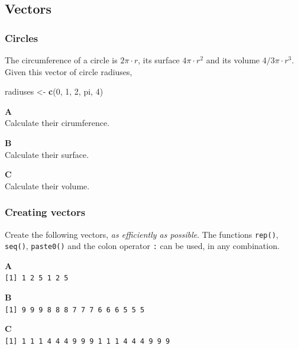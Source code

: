\documentclass[]{book}
\newenvironment{Shaded}{\begin{snugshade}}{\end{snugshade}}
\newcommand{\DecValTok}[1]{\textcolor[rgb]{0.00,0.00,0.81}{#1}}
\newcommand{\KeywordTok}[1]{\textcolor[rgb]{0.13,0.29,0.53}{\textbf{#1}}}
\newcommand{\NormalTok}[1]{#1}
\newcommand{\StringTok}[1]{\textcolor[rgb]{0.31,0.60,0.02}{#1}}
\begin{document}
\hypertarget{vectors-1}{%
\subsection{Vectors}\label{vectors-1}}

\hypertarget{circles}{%
\subsubsection*{Circles}\label{circles}}

The circumference of a circle is \(2\pi\cdot r\), its surface \(4\pi \cdot r^2\) and its volume \(4/3 \pi\cdot r^3\).
Given this vector of circle radiuses,

\begin{Shaded}
\begin{Highlighting}[]
\NormalTok{radiuses <-}\StringTok{ }\KeywordTok{c}\NormalTok{(}\DecValTok{0}\NormalTok{, }\DecValTok{1}\NormalTok{, }\DecValTok{2}\NormalTok{, pi, }\DecValTok{4}\NormalTok{)}
\end{Highlighting}
\end{Shaded}

\textbf{A}\\
Calculate their cirumference.

\textbf{B}\\
Calculate their surface.

\textbf{C}\\
Calculate their volume.

\hypertarget{creating-vectors-1}{%
\subsubsection*{Creating vectors}\label{creating-vectors-1}}

Create the following vectors, \emph{as efficiently as possible}. The functions \texttt{rep()}, \texttt{seq()}, \texttt{paste0()} and the colon operator \texttt{:} can be used, in any combination.

\textbf{A}\\
\texttt{{[}1{]}\ 1\ 2\ 5\ 1\ 2\ 5}

\textbf{B}\\
\texttt{{[}1{]}\ 9\ 9\ 9\ 8\ 8\ 8\ 7\ 7\ 7\ 6\ 6\ 6\ 5\ 5\ 5}

\textbf{C}\\
\texttt{{[}1{]}\ 1\ 1\ 1\ 4\ 4\ 4\ 9\ 9\ 9\ 1\ 1\ 1\ 4\ 4\ 4\ 9\ 9\ 9}
\end{document}
